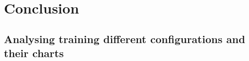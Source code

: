 \section{Conclusion}

\subsection{Analysing training different configurations and their charts}

\newpage